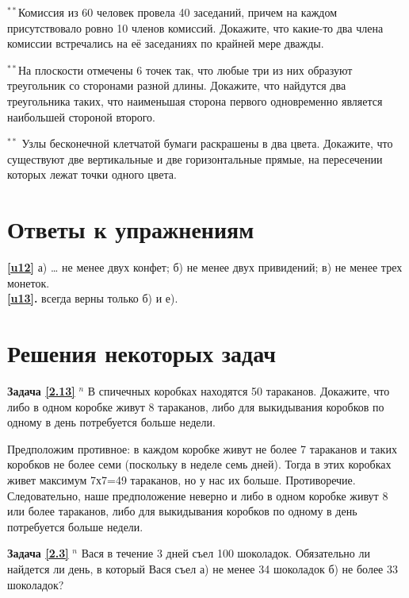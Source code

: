 \begin{thm}
	$^{\ast\ast}$Комиссия из 60 человек провела 40 заседаний, причем на каждом присутствовало ровно 10 членов комиссий. Докажите, что какие-то два члена комиссии встречались на её заседаниях по крайней мере дважды.
\end{thm}

\begin{thm}
	$^{\ast\ast}$На плоскости отмечены 6 точек так, что любые три из них образуют треугольник со сторонами разной длины. Докажите, что найдутся два треугольника таких, что наименьшая сторона первого одновременно является наибольшей стороной второго.
\end{thm}

\begin{thm}
	$^{\ast\ast}$	Узлы бесконечной клетчатой бумаги раскрашены в два цвета. Докажите, что существуют две вертикальные и две горизонтальные прямые, на пересечении которых лежат точки одного цвета.
\end{thm}
\newpage

\section{Ответы к упражнениям} \textbf{\ref{u12}}	а) … не менее двух конфет; б) не менее двух привидений; в) не менее трех монеток.\\ \textbf{\ref{u13}.}	всегда верны только б) и е).
\section{Решения некоторых задач}
\textbf{Задача \ref{2.13}}
	$^n$ В спичечных коробках находятся 50 тараканов. Докажите, что либо в одном коробке живут 8 тараканов, либо для выкидывания коробков по одному в день потребуется больше недели.

\begin{prf}
	Предположим противное: в каждом коробке живут не более 7 тараканов и таких коробков не более семи (поскольку в неделе семь дней). Тогда в этих коробках живет максимум 7х7=49 тараканов, но у нас их больше. Противоречие. Следовательно, наше предположение неверно и либо в одном коробке живут 8 или более тараканов, либо для выкидывания коробков по одному в день потребуется больше недели.
\end{prf}

\textbf{Задача \ref{2.3}}
	$^n$ Вася в течение 3 дней съел 100 шоколадок. Обязательно ли найдется ли день, в который Вася съел а) не менее 34 шоколадок б) не более 33 шоколадок?

